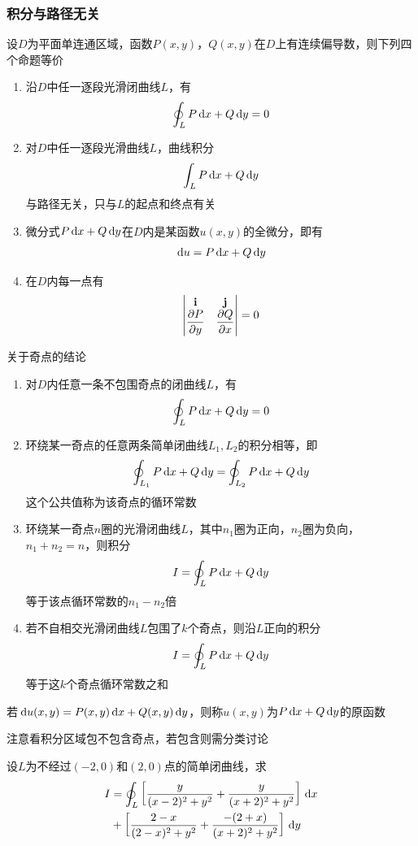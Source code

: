 \subsubsection{积分与路径无关}
\begin{theorem}
设$D$为平面单连通区域，函数$P(x,y)$，$Q(x,y)$在$D$上有连续偏导数，则下列四个命题等价
\begin{enumerate}
	\item 沿$D$中任一逐段光滑闭曲线$L$，有
	\[\oint_LP\,\mathrm{d} x+Q\,\mathrm{d} y=0\]
	\item 对$D$中任一逐段光滑曲线$L$，曲线积分
	\[\int_LP\,\mathrm{d} x+Q\,\mathrm{d} y\]
	与路径无关，只与$L$的起点和终点有关
	\item 微分式$P\,\mathrm{d} x+Q\,\mathrm{d} y$在$D$内是某函数$u(x,y)$的全微分，即有
	\[\,\mathrm{d} u=P\,\mathrm{d} x+Q\,\mathrm{d} y\]
	\item 在$D$内每一点有
	\[\begin{vmatrix}\mathbf{i}&\mathbf{j}\\\dfrac{\partial P}{\partial y}&\dfrac{\partial Q}{\partial x}\end{vmatrix}=0\]
\end{enumerate}
\end{theorem}
\begin{theorem}[奇点]
关于奇点的结论
\begin{enumerate}
	\item 对$D$内任意一条不包围奇点的闭曲线$L$，有
	\[\oint_LP\,\mathrm{d} x+Q\,\mathrm{d} y=0\]
	\item 环绕某一奇点的任意两条简单闭曲线$L_1,L_2$的积分相等，即
	\[\oint_{L_1}P\,\mathrm{d} x+Q\,\mathrm{d} y=\oint_{L_2}P\,\mathrm{d} x+Q\,\mathrm{d} y\]
	这个公共值称为该奇点的循环常数
	\item 环绕某一奇点$n$圈的光滑闭曲线$L$，其中$n_1$圈为正向，$n_2$圈为负向，$n_1+n_2=n$，则积分
	\[I=\oint_LP\,\mathrm{d} x+Q\,\mathrm{d} y\]
	等于该点循环常数的$n_1-n_2$倍
	\item 若不自相交光滑闭曲线$L$包围了$k$个奇点，则沿$L$正向的积分
	\[I=\oint_LP\,\mathrm{d} x+Q\,\mathrm{d} y\]
	等于这$k$个奇点循环常数之和
\end{enumerate}
\end{theorem}
\begin{definition}[原函数]
若$\,\mathrm{d} u(x,y)=P(x,y)\,\mathrm{d} x+Q(x,y)\,\mathrm{d} y$，则称$u(x,y)$为$P\,\mathrm{d} x+Q\,\mathrm{d} y$的原函数
\end{definition}
\par 注意看积分区域包不包含奇点，若包含则需分类讨论
\begin{example}
设$L$为不经过$(-2,0)$和$(2,0)$点的简单闭曲线，求
\[\begin{aligned}
I&=\oint_L\left[\frac{y}{(x-2)^2+y^2}+\frac{y}{(x+2)^2+y^2}\right]\,\mathrm{d} x\\
&+\left[\frac{2-x}{(2-x)^2+y^2}+\frac{-(2+x)}{(x+2)^2+y^2}\right]\,\mathrm{d} y
\end{aligned}\]
\end{example}
